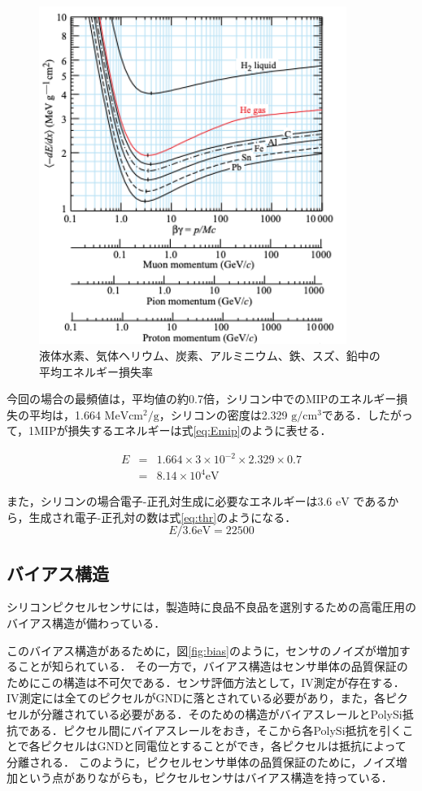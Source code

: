 \begin{figure}[h]
  \centering
  \includegraphics[width=10cm]{./figure/Landau.png}
  \caption{液体水素、気体ヘリウム、炭素、アルミニウム、鉄、スズ、鉛中の平均エネルギー損失率\cite{Tanabashi:2018oca}}
  \label{fig:landau}
\end{figure}


今回の場合の最頻値は，平均値の約0.7倍，シリコン中でのMIPのエネルギー損失の平均は，1.664 $\mathrm{MeV cm^2/g}$，シリコンの密度は2.329 $\mathrm{g/cm^3}$である．したがって，1MIPが損失するエネルギーは式\ref{eq:Emip}のように表せる．

\begin{eqnarray}
  E &=& 1.664 \times 3 \times 10^{-2} \times 2.329 \times 0.7 \nonumber \\
  \label{eq:Emip}
  &=& 8.14 \times 10^4 \mathrm{eV}
\end{eqnarray}

また，シリコンの場合電子-正孔対生成に必要なエネルギーは3.6 $\mathrm{eV}$ \cite{SMSze}であるから，生成され電子-正孔対の数は式\ref{eq:thr}のようになる．
\begin{equation}
  \label{eq:thr}
  E / 3.6 \mathrm{eV} = 22500
\end{equation}


\subsection{バイアス構造}
シリコンピクセルセンサには，製造時に良品不良品を選別するための高電圧用のバイアス構造が備わっている．\par
このバイアス構造があるために，図\ref{fig:bias}のように，センサのノイズが増加することが知られている．
その一方で，バイアス構造はセンサ単体の品質保証のためにこの構造は不可欠である．センサ評価方法として，IV測定が存在する．IV測定には全てのピクセルがGNDに落とされている必要があり，また，各ピクセルが分離されている必要がある．そのための構造がバイアスレールとPolySi抵抗である．ピクセル間にバイアスレールをおき，そこから各PolySi抵抗を引くことで各ピクセルはGNDと同電位とすることができ，各ピクセルは抵抗によって分離される．
このように，ピクセルセンサ単体の品質保証のために，ノイズ増加という点がありながらも，ピクセルセンサはバイアス構造を持っている．

